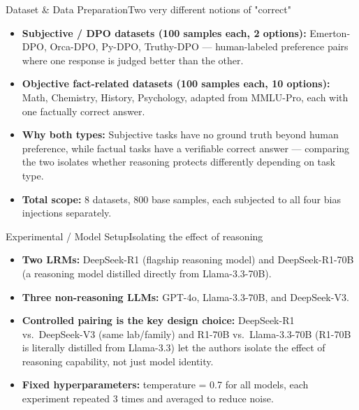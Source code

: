 \documentclass[10pt]{beamer}
\begin{document}
	\begin{frame}{Dataset \& Data Preparation}{Two very different notions of "correct"}
	\begin{itemize}
		\item \textbf{Subjective / DPO datasets (100 samples each, 2 options):} Emerton-DPO, Orca-DPO, Py-DPO, Truthy-DPO — human-labeled preference pairs where one response is judged better than the other.
		\item \textbf{Objective fact-related datasets (100 samples each, 10 options):} Math, Chemistry, History, Psychology, adapted from MMLU-Pro, each with one factually correct answer.
		\item \textbf{Why both types:} Subjective tasks have no ground truth beyond human preference, while factual tasks have a verifiable correct answer — comparing the two isolates whether reasoning protects differently depending on task type.
		\item \textbf{Total scope:} 8 datasets, 800 base samples, each subjected to all four bias injections separately.
	\end{itemize}
	\end{frame}

	\begin{frame}{Experimental / Model Setup}{Isolating the effect of reasoning}
	\begin{itemize}
		\item \textbf{Two LRMs:} DeepSeek-R1 (flagship reasoning model) and DeepSeek-R1-70B (a reasoning model distilled directly from Llama-3.3-70B).
		\item \textbf{Three non-reasoning LLMs:} GPT-4o, Llama-3.3-70B, and DeepSeek-V3.
		\item \textbf{Controlled pairing is the key design choice:} DeepSeek-R1 vs.\ DeepSeek-V3 (same lab/family) and R1-70B vs.\ Llama-3.3-70B (R1-70B is literally distilled from Llama-3.3) let the authors isolate the effect of reasoning capability, not just model identity.
		\item \textbf{Fixed hyperparameters:} temperature = 0.7 for all models, each experiment repeated 3 times and averaged to reduce noise.
	\end{itemize}
	\end{frame}
\end{document}
